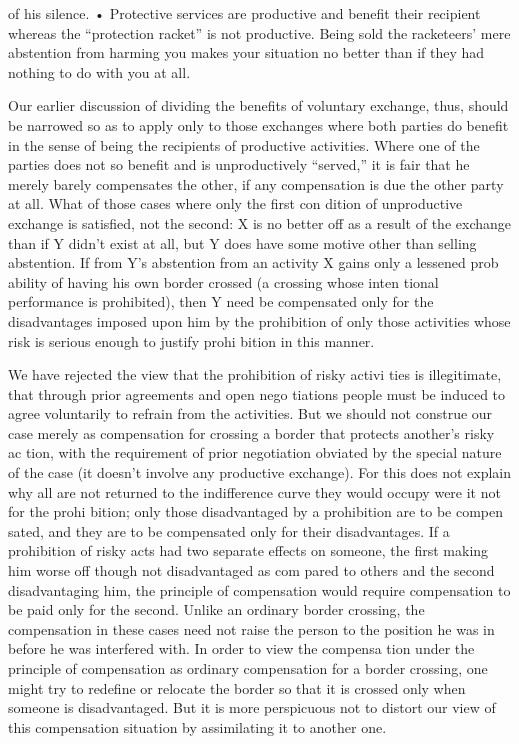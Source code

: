 \documentclass[11pt,openany]{book}
\begin{document}
of his silence. • Protective services are productive and benefit their recipient whereas the ``protection racket'' is not productive. Being sold the racketeers' mere abstention from harming you makes your situation no better than if they had nothing to do with you at all. 

Our earlier discussion of dividing the benefits of voluntary exchange, thus, should be narrowed so as to apply only to those exchanges where both parties do benefit in the sense of being the recipients of productive activities. Where one of the parties does not so benefit and is unproductively ``served,'' it is fair that he merely barely compensates the other, if any compensation is due the other party at all. What of those cases where only the first con dition of unproductive exchange is satisfied, not the second: X is no better off as a result of the exchange than if Y didn't exist at all, but Y does have some motive other than selling abstention. If from Y's abstention from an activity X gains only a lessened prob ability of having his own border crossed (a crossing whose inten tional performance is prohibited), then Y need be compensated only for the disadvantages imposed upon him by the prohibition of only those activities whose risk is serious enough to justify prohi bition in this manner. 

We have rejected the view that the prohibition of risky activi ties is illegitimate, that through prior agreements and open nego tiations people must be induced to agree voluntarily to refrain from the activities. But we should not construe our case merely as compensation for crossing a border that protects another's risky ac tion, with the requirement of prior negotiation obviated by the special nature of the case (it doesn't involve any productive exchange). For this does not explain why all are not returned to the indifference curve they would occupy were it not for the prohi bition; only those disadvantaged by a prohibition are to be compen sated, and they are to be compensated only for their disadvantages. If a prohibition of risky acts had two separate effects on someone, the first making him worse off though not disadvantaged as com pared to others and the second disadvantaging him, the principle of compensation would require compensation to be paid only for the second. Unlike an ordinary border crossing, the compensation in these cases need not raise the person to the position he was in before he was interfered with. In order to view the compensa tion under the principle of compensation as ordinary compensation for a border crossing, one might try to redefine or relocate the border so that it is crossed only when someone is disadvantaged. But it is more perspicuous not to distort our view of this compensation situation by assimilating it to another one. 
\end{document}
